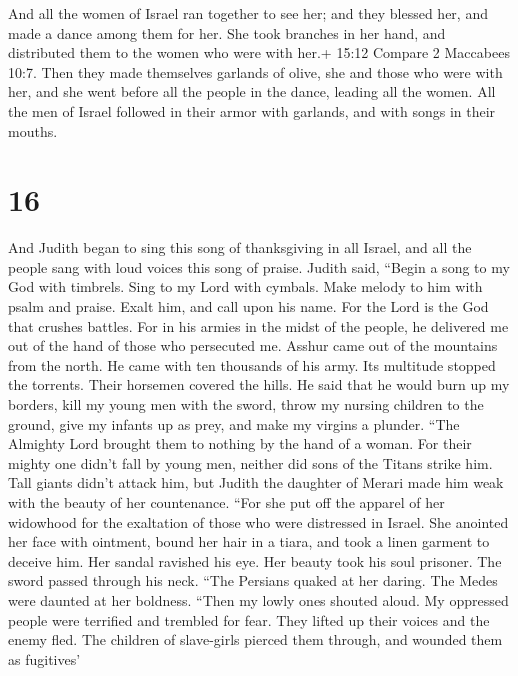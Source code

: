  And all the women of Israel ran together to see her; and
they blessed her, and made a dance among them for her. She took branches
in her hand, and distributed them to the women who were with her.+ 15:12
Compare 2 Maccabees 10:7.  Then they made themselves
garlands of olive, she and those who were with her, and she went before
all the people in the dance, leading all the women. All the men of
Israel followed in their armor with garlands, and with songs in their
mouths.

\hypertarget{section-15}{%
\section{16}\label{section-15}}

 And Judith began to sing this song of thanksgiving in all
Israel, and all the people sang with loud voices this song of praise.
 Judith said, ``Begin a song to my God with timbrels. Sing
to my Lord with cymbals. Make melody to him with psalm and praise. Exalt
him, and call upon his name.  For the Lord is the God that
crushes battles. For in his armies in the midst of the people, he
delivered me out of the hand of those who persecuted me. 
Asshur came out of the mountains from the north. He came with ten
thousands of his army. Its multitude stopped the torrents. Their
horsemen covered the hills.  He said that he would burn up
my borders, kill my young men with the sword, throw my nursing children
to the ground, give my infants up as prey, and make my virgins a
plunder.  ``The Almighty Lord brought them to nothing by the
hand of a woman.  For their mighty one didn't fall by young
men, neither did sons of the Titans strike him. Tall giants didn't
attack him, but Judith the daughter of Merari made him weak with the
beauty of her countenance.  ``For she put off the apparel of
her widowhood for the exaltation of those who were distressed in Israel.
She anointed her face with ointment, bound her hair in a tiara, and took
a linen garment to deceive him.  Her sandal ravished his
eye. Her beauty took his soul prisoner. The sword passed through his
neck.  ``The Persians quaked at her daring. The Medes were
daunted at her boldness.  ``Then my lowly ones shouted
aloud. My oppressed people were terrified and trembled for fear. They
lifted up their voices and the enemy fled.  The children of
slave-girls pierced them through, and wounded them as fugitives'
